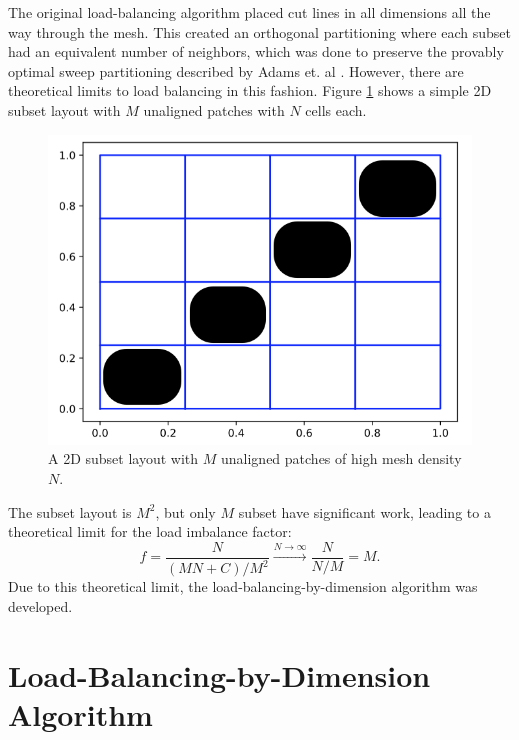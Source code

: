 The original load-balancing algorithm placed cut lines in all dimensions all the way through the mesh.
This created an orthogonal partitioning where each subset had an equivalent number of neighbors, which was done to preserve the provably optimal sweep partitioning described by Adams et. al \cite{mpadams2013,mpadams2015}.
However, there are theoretical limits to load balancing in this fashion. Figure \ref{2dgeneral} shows a simple 2D subset layout with $M$ unaligned patches with $N$ cells each.

\begin{figure}[H]
\centering
\includegraphics[scale=0.4]{../figures/theoretical_plot.png}
 \caption{A 2D subset layout with $M$ unaligned patches of high mesh density $N$.}
\label{2dgeneral}
\end{figure}
The subset layout is $M^2$, but only $M$ subset have significant work, leading to a theoretical limit for the load imbalance factor:
\begin{equation}
f= \frac{N}{(MN+C)/M^2} \xrightarrow{N\to \infty} \frac{N}{N/M} = M.
\end{equation}
Due to this theoretical limit, the load-balancing-by-dimension algorithm was developed.

\section{Load-Balancing-by-Dimension Algorithm}
\label{sec:lbd}

